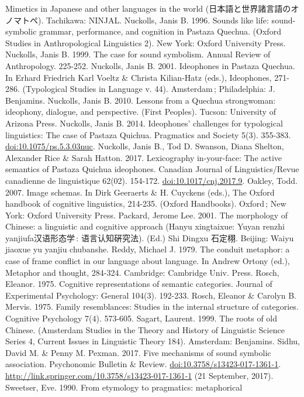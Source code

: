Mimetics in Japanese and other languages in the world
(日本語と世界諸言語のオノマトペ). Tachikawa: NINJAL. Nuckolls, Janis B.
1996. Sounds like life: sound-symbolic grammar, performance, and
cognition in Pastaza Quechua. (Oxford Studies in Anthropological
Linguistics 2). New York: Oxford University Press. Nuckolls, Janis B.
1999. The case for sound symbolism. Annual Review of Anthropology.
225-252. Nuckolls, Janis B. 2001. Ideophones in Pastaza Quechua. In
Erhard Friedrich Karl Voeltz \& Christa Kilian-Hatz (eds.), Ideophones,
271-286. (Typological Studies in Language v. 44). Amsterdam\,;
Philadelphia: J. Benjamins. Nuckolls, Janis B. 2010. Lessons from a
Quechua strongwoman: ideophony, dialogue, and perspective. (First
Peoples). Tucson: University of Arizona Press. Nuckolls, Janis B. 2014.
Ideophones' challenges for typological linguistics: The case of Pastaza
Quichua. Pragmatics and Society 5(3). 355-383.
\url{doi:10.1075/ps.5.3.03nuc}. Nuckolls, Janis B., Tod D. Swanson,
Diana Shelton, Alexander Rice \& Sarah Hatton. 2017. Lexicography
in-your-face: The active semantics of Pastaza Quichua ideophones.
Canadian Journal of Linguistics/Revue canadienne de linguistique 62(02).
154-172. \url{doi:10.1017/cnj.2017.9}. Oakley, Todd. 2007. Image
schemas. In Dirk Geeraerts \& H. Cuyckens (eds.), The Oxford handbook of
cognitive linguistics, 214-235. (Oxford Handbooks). Oxford\,; New York:
Oxford University Press. Packard, Jerome Lee. 2001. The morphology of
Chinese: a linguistic and cognitive approach (Hanyu xingtaixue: Yuyan
renzhi yanjiufa汉语形态学\,: 语言认知硏究法). (Ed.) Shi Dingxu 石定栩.
Beijing: Waiyu jiaoxue yu yanjiu chubanshe. Reddy, Michael J. 1979. The
conduit metaphor: a case of frame conflict in our language about
language. In Andrew Ortony (ed.), Metaphor and thought, 284-324.
Cambridge: Cambridge Univ. Press. Rosch, Eleanor. 1975. Cognitive
representations of semantic categories. Journal of Experimental
Psychology: General 104(3). 192-233. Rosch, Eleanor \& Carolyn B.
Mervis. 1975. Family resemblances: Studies in the internal structure of
categories. Cognitive Psychology 7(4). 573-605. Sagart, Laurent. 1999.
The roots of old Chinese. (Amsterdam Studies in the Theory and History
of Linguistic Science Series 4, Current Issues in Linguistic Theory
184). Amsterdam: Benjamins. Sidhu, David M. \& Penny M. Pexman. 2017.
Five mechanisms of sound symbolic association. Psychonomic Bulletin \&
Review. \url{doi:10.3758/s13423-017-1361-1}.
\url{http://link.springer.com/10.3758/s13423-017-1361-1} (21 September,
2017). Sweetser, Eve. 1990. From etymology to pragmatics: metaphorical
